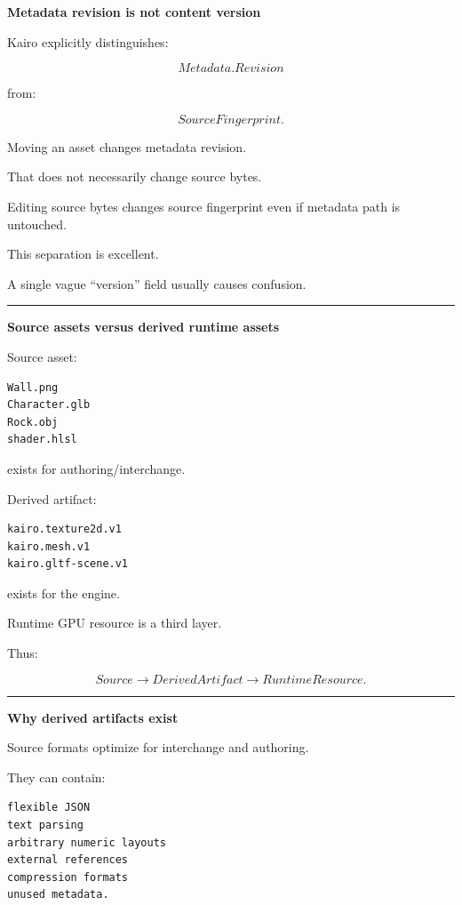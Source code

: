 \textbf{Metadata revision is not content version}

Kairo explicitly distinguishes:

\[
Metadata.Revision
\]

from:

\[
SourceFingerprint.
\]

Moving an asset changes metadata revision.

That does not necessarily change source bytes.

Editing source bytes changes source fingerprint even if metadata path is untouched.

This separation is excellent.

A single vague ``version'' field usually causes confusion.

\begin{center}\rule{0.5\linewidth}{0.5pt}\end{center}

\textbf{Source assets versus derived runtime assets}

Source asset:

\begin{verbatim}
Wall.png
Character.glb
Rock.obj
shader.hlsl
\end{verbatim}

exists for authoring/interchange.

Derived artifact:

\begin{verbatim}
kairo.texture2d.v1
kairo.mesh.v1
kairo.gltf-scene.v1
\end{verbatim}

exists for the engine.

Runtime GPU resource is a third layer.

Thus:

\[
\boxed{
Source
\rightarrow
DerivedArtifact
\rightarrow
RuntimeResource.
}
\]

\begin{center}\rule{0.5\linewidth}{0.5pt}\end{center}

\textbf{Why derived artifacts exist}

Source formats optimize for interchange and authoring.

They can contain:

\begin{verbatim}
flexible JSON
text parsing
arbitrary numeric layouts
external references
compression formats
unused metadata.
\end{verbatim}


